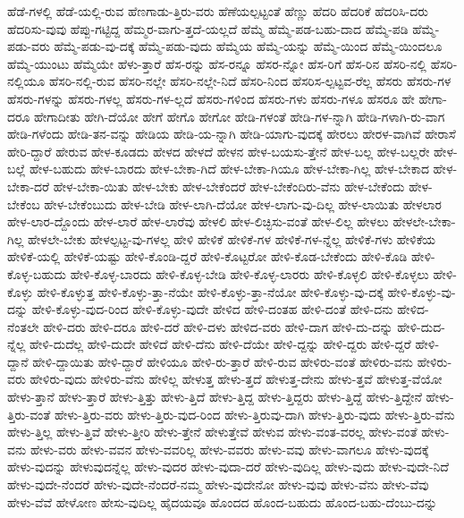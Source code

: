 {ಹೆಡೆ-ಗಳಲ್ಲಿ
ಹೆಡೆ-ಯಲ್ಲಿ-ರುವ
ಹೆಣಗಾಡು-ತ್ತಿರು-ವರು
ಹೆಣೆಯಲ್ಪಟ್ಟಂತೆ
ಹೆಣ್ಣು
ಹೆದರಿ
ಹೆದರಿಕೆ
ಹೆದರಿಸಿ-ದರು
ಹೆದರಿಸು-ವುವು
ಹೆಪ್ಪು-ಗಟ್ಟಿದ್ದ
ಹೆಮ್ಮರ-ವಾಗು-ತ್ತದೆ-ಯಲ್ಲದೆ
ಹೆಮ್ಮೆ
ಹೆಮ್ಮೆ-ಪಡ-ಬಹು-ದಾದ
ಹೆಮ್ಮೆ-ಪಡಿ
ಹೆಮ್ಮೆ-ಪಡು-ವರು
ಹೆಮ್ಮೆ-ಪಡು-ವು-ದಕ್ಕೆ
ಹೆಮ್ಮೆ-ಪಡು-ವುದು
ಹೆಮ್ಮೆಯ
ಹೆಮ್ಮೆ-ಯನ್ನು
ಹೆಮ್ಮೆ-ಯಿಂದ
ಹೆಮ್ಮೆ-ಯಿಂದಲೂ
ಹೆಮ್ಮೆ-ಯುಂಟು
ಹೆಮ್ಮೆಯೇ
ಹೆಳು-ತ್ತಾರೆ
ಹೆಸ-ರನ್ನು
ಹೆಸ-ರನ್ನೂ
ಹೆಸರ-ನ್ನೋ
ಹೆಸ-ರಿಗೆ
ಹೆಸ-ರಿನ
ಹೆಸರಿ-ನಲ್ಲಿ
ಹೆಸರಿ-ನಲ್ಲಿಯೂ
ಹೆಸರಿ-ನಲ್ಲಿ-ರುವ
ಹೆಸರಿ-ನಲ್ಲೇ
ಹೆಸರಿ-ನಲ್ಲೇ-ನಿದೆ
ಹೆಸರಿ-ನಿಂದ
ಹೆಸರಿಸ-ಲ್ಪಟ್ಟವ-ರೆಲ್ಲ
ಹೆಸರು
ಹೆಸರು-ಗಳ
ಹೆಸರು-ಗಳನ್ನು
ಹೆಸರು-ಗಳಲ್ಲ
ಹೆಸರು-ಗಳ-ಲ್ಲದೆ
ಹೆಸರು-ಗಳಿಂದ
ಹೆಸರು-ಗಳು
ಹೆಸರು-ಗಳೂ
ಹೆಸರೂ
ಹೇ
ಹೇಗಾ-ದರೂ
ಹೇಗಾದೀತು
ಹೇಗಿ-ದೆಯೋ
ಹೇಗೆ
ಹೇಗೊ
ಹೇಗೋ
ಹೇಡಿ-ಗಳಂತೆ
ಹೇಡಿ-ಗಳ-ನ್ನಾಗಿ
ಹೇಡಿ-ಗಳಾಗಿ-ರು-ವಾಗ
ಹೇಡಿ-ಗಳೆಂದು
ಹೇಡಿ-ತನ-ವನ್ನು
ಹೇಡಿಯ
ಹೇಡಿ-ಯ-ನ್ನಾಗಿ
ಹೇಡಿ-ಯಾಗು-ವುದಕ್ಕೆ
ಹೇರಲು
ಹೇರಳ-ವಾಗಿವೆ
ಹೇರಾಸೆ
ಹೇರಿ-ದ್ದಾರೆ
ಹೇರುವ
ಹೇಳ-ಕೂಡದು
ಹೇಳದ
ಹೇಳದೆ
ಹೇಳನ
ಹೇಳ-ಬಯಸು-ತ್ತೇನೆ
ಹೇಳ-ಬಲ್ಲ
ಹೇಳ-ಬಲ್ಲರೇ
ಹೇಳ-ಬಲ್ಲೆ
ಹೇಳ-ಬಹುದು
ಹೇಳ-ಬಾರದು
ಹೇಳ-ಬೇಕಾ-ಗಿದೆ
ಹೇಳ-ಬೇಕಾ-ಗಿಯೂ
ಹೇಳ-ಬೇಕಾ-ಗಿಲ್ಲ
ಹೇಳ-ಬೇಕಾದ
ಹೇಳ-ಬೇಕಾ-ದರೆ
ಹೇಳ-ಬೇಕಾ-ಯಿತು
ಹೇಳ-ಬೇಕು
ಹೇಳ-ಬೇಕೆಂದರೆ
ಹೇಳ-ಬೇಕೆಂದಿರು-ವೆನು
ಹೇಳ-ಬೇಕೆಂದು
ಹೇಳ-ಬೇಕೆಂಬ
ಹೇಳ-ಬೇಕೆಂಬುದು
ಹೇಳ-ಬೇಡಿ
ಹೇಳ-ಲಾಗಿ-ದೆಯೋ
ಹೇಳ-ಲಾಗು-ವು-ದಿಲ್ಲ
ಹೇಳ-ಲಾಯಿತು
ಹೇಳಲಾರ
ಹೇಳ-ಲಾರ-ದ್ದೊಂದು
ಹೇಳ-ಲಾರೆ
ಹೇಳ-ಲಾರೆವು
ಹೇಳಲಿ
ಹೇಳ-ಲಿಚ್ಛಿಸು-ವಂತೆ
ಹೇಳ-ಲಿಲ್ಲ
ಹೇಳಲು
ಹೇಳಲೇ-ಬೇಕಾ-ಗಿಲ್ಲ
ಹೇಳಲೇ-ಬೇಕು
ಹೇಳಲ್ಪಟ್ಟ-ವು-ಗಳಲ್ಲ
ಹೇಳಿ
ಹೇಳಿಕೆ
ಹೇಳಿಕೆ-ಗಳ
ಹೇಳಿಕೆ-ಗಳ-ನ್ನೆಲ್ಲ
ಹೇಳಿಕೆ-ಗಳು
ಹೇಳಿಕೆಯ
ಹೇಳಿಕೆ-ಯಲ್ಲಿ
ಹೇಳಿಕೆ-ಯಷ್ಟು
ಹೇಳಿ-ಕೊಂಡಿ-ದ್ದರೆ
ಹೇಳಿ-ಕೊಟ್ಟರೋ
ಹೇಳಿ-ಕೊಡ-ಬೇಕೆಂದು
ಹೇಳಿ-ಕೊಡಿ
ಹೇಳಿ-ಕೊಳ್ಳ-ಬಹುದು
ಹೇಳಿ-ಕೊಳ್ಳ-ಬಾರದು
ಹೇಳಿ-ಕೊಳ್ಳ-ಬೇಡಿ
ಹೇಳಿ-ಕೊಳ್ಳ-ಲಾರರು
ಹೇಳಿ-ಕೊಳ್ಳಲಿ
ಹೇಳಿ-ಕೊಳ್ಳಲು
ಹೇಳಿ-ಕೊಳ್ಳು
ಹೇಳಿ-ಕೊಳ್ಳುತ್ತ
ಹೇಳಿ-ಕೊಳ್ಳು-ತ್ತಾ-ನೆಯೇ
ಹೇಳಿ-ಕೊಳ್ಳು-ತ್ತಾ-ನೆಯೋ
ಹೇಳಿ-ಕೊಳ್ಳು-ವು-ದಕ್ಕೆ
ಹೇಳಿ-ಕೊಳ್ಳು-ವು-ದನ್ನು
ಹೇಳಿ-ಕೊಳ್ಳು-ವುದ-ರಿಂದ
ಹೇಳಿ-ಕೊಳ್ಳು-ವುದೇ
ಹೇಳಿದ
ಹೇಳಿ-ದಂತಹ
ಹೇಳಿ-ದಂತೆ
ಹೇಳಿ-ದನು
ಹೇಳಿದ-ನೆಂತಲೇ
ಹೇಳಿ-ದರು
ಹೇಳಿ-ದರೂ
ಹೇಳಿ-ದರೆ
ಹೇಳಿ-ದಳು
ಹೇಳಿದ-ವರು
ಹೇಳಿ-ದಾಗ
ಹೇಳಿ-ದು-ದನ್ನು
ಹೇಳಿ-ದುದ-ನ್ನೆಲ್ಲ
ಹೇಳಿ-ದುದೆಲ್ಲ
ಹೇಳಿ-ದುದೇ
ಹೇಳಿದೆ
ಹೇಳಿ-ದೆನು
ಹೇಳಿ-ದೆಯೇ
ಹೇಳಿ-ದ್ದನ್ನು
ಹೇಳಿ-ದ್ದರು
ಹೇಳಿ-ದ್ದರೆ
ಹೇಳಿ-ದ್ದಾನೆ
ಹೇಳಿ-ದ್ದಾಯಿತು
ಹೇಳಿ-ದ್ದಾರೆ
ಹೇಳಿಯೂ
ಹೇಳಿ-ರು-ತ್ತಾರೆ
ಹೇಳಿ-ರುವ
ಹೇಳಿರು-ವಂತೆ
ಹೇಳಿರು-ವನು
ಹೇಳಿರು-ವರು
ಹೇಳಿರು-ವುದು
ಹೇಳಿರು-ವೆನು
ಹೇಳಿಲ್ಲ
ಹೇಳುತ್ತ
ಹೇಳು-ತ್ತದೆ
ಹೇಳುತ್ತ-ದೇನು
ಹೇಳು-ತ್ತವೆ
ಹೇಳುತ್ತ-ವೆಯೋ
ಹೇಳು-ತ್ತಾನೆ
ಹೇಳು-ತ್ತಾರೆ
ಹೇಳು-ತ್ತಿತ್ತು
ಹೇಳು-ತ್ತಿದೆ
ಹೇಳು-ತ್ತಿದ್ದ
ಹೇಳು-ತ್ತಿದ್ದರು
ಹೇಳು-ತ್ತಿದ್ದೆ
ಹೇಳು-ತ್ತಿದ್ದೇನೆ
ಹೇಳು-ತ್ತಿರು-ವಂತೆ
ಹೇಳು-ತ್ತಿರು-ವರು
ಹೇಳು-ತ್ತಿರು-ವುದ-ರಿಂದ
ಹೇಳು-ತ್ತಿರುವು-ದಾಗಿ
ಹೇಳು-ತ್ತಿರು-ವುದು
ಹೇಳು-ತ್ತಿರು-ವೆನು
ಹೇಳು-ತ್ತಿಲ್ಲ
ಹೇಳು-ತ್ತಿವೆ
ಹೇಳು-ತ್ತೀರಿ
ಹೇಳು-ತ್ತೇನೆ
ಹೇಳುತ್ತೇವೆ
ಹೇಳುವ
ಹೇಳು-ವಂತ-ವರಲ್ಲ
ಹೇಳು-ವಂತೆ
ಹೇಳು-ವನು
ಹೇಳು-ವರು
ಹೇಳು-ವವನ
ಹೇಳು-ವವರಿಲ್ಲ
ಹೇಳು-ವವರು
ಹೇಳು-ವವು
ಹೇಳು-ವಾಗಲೂ
ಹೇಳು-ವುದಕ್ಕೆ
ಹೇಳು-ವುದನ್ನು
ಹೇಳುವುದನ್ನೆಲ್ಲ
ಹೇಳು-ವುದರ
ಹೇಳು-ವುದಾ-ದರೆ
ಹೇಳು-ವುದಿಲ್ಲ
ಹೇಳು-ವುದು
ಹೇಳು-ವುದೇ-ನಿದೆ
ಹೇಳು-ವುದೇ-ನೆಂದರೆ
ಹೇಳು-ವುದೇ-ನೆಂದರೆ-ನಮ್ಮ
ಹೇಳು-ವುದೇನೋ
ಹೇಳು-ವುವು
ಹೇಳು-ವೆನು
ಹೇಳು-ವೆವು
ಹೇಳು-ವೆವೆ
ಹೇಳೋಣ
ಹೇಸು-ವುದಿಲ್ಲ
ಹೈದಯವೂ
ಹೊಂದದ
ಹೊಂದ-ಬಹುದು
ಹೊಂದ-ಬಹು-ದೆಂಬು-ದನ್ನು
}
